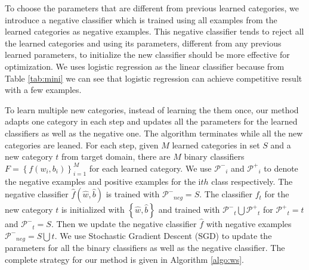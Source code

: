 To choose the parameters that are different from previous learned categories, we introduce a negative classifier which is trained using all examples from the learned categories as negative examples. This negative classifier tends to reject all the learned categories and using its parameters, different from any previous learned parameters, to initialize the new classifier should be more effective for optimization. We uses logistic regression as the linear classifier because from Table \ref{tab:mini} we can see that logistic regression can achieve competitive result with a few examples.

To learn multiple new categories, instead of learning the them once, our method adapts one category in each step and updates all the parameters for the learned classifiers as well as the negative one. The algorithm terminates while all the new categories are leaned.
For each step, given $M$ learned categories in set $S$ and a new category $t$ from target domain, there are $M$ binary classifiers $F=\left\{ {{f}\left( {{w_i},{b_i}} \right)} \right\}_{i = 1}^M$ for each learned category. We use $\mathcal{P^-}_i$ and $\mathcal{P^+}_i$ to denote the negative examples and positive examples for the i$th$ class respectively. The negative classifier $\hat{f}(\hat{w},\hat{b})$ is trained with $\mathcal{P^-}_{neg}=S$. The classifier $f_t$ for the new category $t$ is initialized with $\left\{\hat{w},\hat{b}\right\}$ and trained with $\mathcal{P^-}_t\bigcup\mathcal{P^+}_t$ for $\mathcal{P^+}_t=t$ and $\mathcal{P^-}_t=S$. Then we update the negative classifier $\hat{f}$ with negative examples $\mathcal{P^-}_{neg}=S\bigcup t$. We use Stochastic Gradient Descent (SGD) to update the parameters for all the binary classifiers as well as the negative classifier. The complete strategy for our method is given in Algorithm \ref{algo:ws}.
